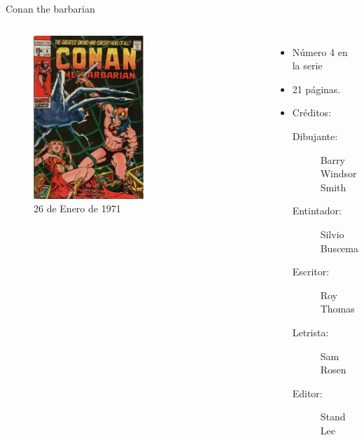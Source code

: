 \begin{frame}{Conan the barbarian}
\begin{columns}
    \begin{figure}[htb]
    \centering
        \includegraphics[width=0.55\textwidth]{img/TheBarbarian004Portada}
        \caption{26 de Enero de 1971}
    \end{figure}    
    \begin{itemize}
         \item Número 4 en la serie
         \item 21 páginas.
         \item Créditos:
         \begin{description}
            \item[Dibujante:] Barry Windsor Smith
            \item[Entintador:] Silvio  Buscema
            \item[Escritor:] Roy Thomas
            \item[Letrista:] Sam Rosen
            \item[Editor:] Stand Lee
         \end{description}
    \end{itemize}
\end{columns}
\end{frame}

